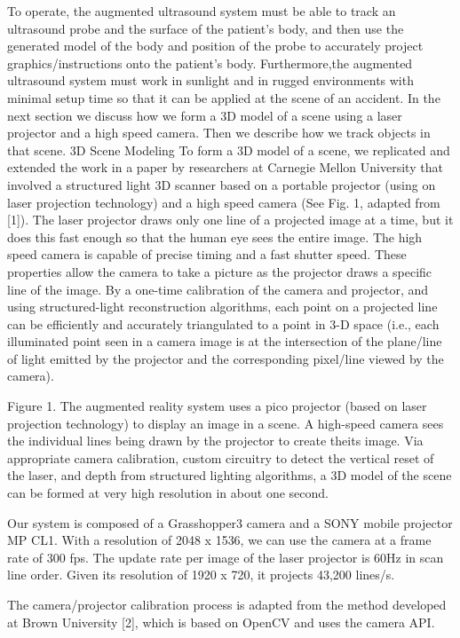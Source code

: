 \documentclass{llncs}
\begin{document}
To operate, the augmented ultrasound system must be able to track an ultrasound probe and the surface of the patient’s body, and then use the generated model of the body and position of the probe to accurately project graphics/instructions onto the patient’s body.  Furthermore,the augmented ultrasound system must work in sunlight and in rugged environments with minimal setup time so that it can be applied at the scene of an accident.  In the next section we discuss how we form a 3D model of a scene using a laser projector and a high speed camera.  Then we describe how we track objects in that scene.
3D Scene Modeling
To form a 3D model of a scene, we replicated and extended the work in a paper by researchers at Carnegie Mellon University that involved a structured light 3D scanner based on a portable projector (using on laser projection technology) and a high speed camera (See Fig. 1, adapted from [1]). The laser projector draws only one line of a projected image at a time, but it does this fast enough so that the human eye sees the entire image. The high speed camera is capable of precise timing and a fast shutter speed. These properties allow the camera to take a picture as the projector draws a specific line of the image. By a one-time calibration of the camera and projector, and using structured-light reconstruction algorithms, each point on a projected line can be efficiently and accurately triangulated to a point in 3-D space (i.e., each illuminated point seen in a camera image is at the intersection of the plane/line of light emitted by the projector and the corresponding pixel/line viewed by the camera).


Figure 1. The augmented reality system uses a pico projector (based on laser projection technology) to display an image in a scene.  A high-speed camera sees the individual lines being drawn by the projector to create theits image.   Via appropriate camera calibration, custom circuitry to detect the vertical reset of the laser, and depth from structured lighting algorithms, a 3D model of the scene can be formed at very high resolution in about one second.

Our system is composed of a Grasshopper3 camera and a SONY mobile projector MP CL1. With a resolution of 2048 x 1536, we can use the camera at a frame rate of 300 fps. The update rate per image of the laser projector is 60Hz in scan line order. Given its resolution of 1920 x 720, it projects 43,200 lines/s.
 
The camera/projector calibration process is adapted from the method developed at Brown University [2], which is based on OpenCV and uses the camera API.
 
\end{document}
